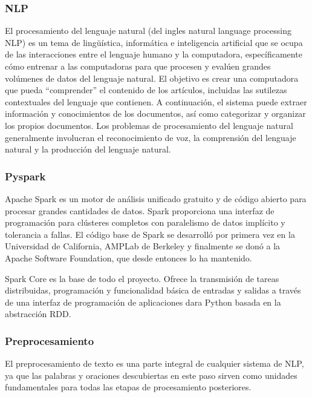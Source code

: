 \documentclass[12pt]{article}
\begin{document}
			\subsubsection{NLP}
			El procesamiento del lenguaje natural (del ingles natural language processing NLP) es un tema de lingüística, informática e inteligencia artificial que se ocupa de las interacciones entre el lenguaje humano y la computadora, específicamente cómo entrenar a las computadoras para que procesen y evalúen grandes volúmenes de datos del lenguaje natural. El objetivo es crear una computadora que pueda ``comprender'' el contenido de los artículos, incluidas las sutilezas contextuales del lenguaje que contienen. A continuación, el sistema puede extraer información y conocimientos de los documentos, así como categorizar y organizar los propios documentos.	Los problemas de procesamiento del lenguaje natural generalmente involucran el reconocimiento de voz, la comprensión del lenguaje natural y la producción del lenguaje natural. \cite{Razno2019}
			
						
			\subsubsection{Pyspark}
			Apache Spark es un motor de análisis unificado gratuito y de código abierto para procesar grandes cantidades de datos. Spark proporciona una interfaz de programación para clústeres completos con paralelismo de datos implícito y tolerancia a fallas. El código base de Spark se desarrolló por primera vez en la Universidad de California, AMPLab de Berkeley y finalmente se donó a la Apache Software Foundation, que desde entonces lo ha mantenido.\cite{Gressling2020}
			
			Spark Core es la base de todo el proyecto. Ofrece la transmisión de tareas distribuidas, programación y funcionalidad básica de entradas y salidas a través de una interfaz de programación de aplicaciones dara Python basada en la abstracción RDD.\cite{Vermeulen2018}
			
			\subsubsection{Preprocesamiento}
			El preprocesamiento de texto es una parte integral de cualquier sistema de NLP, ya que las palabras y oraciones descubiertas en este paso sirven como unidades fundamentales para todas las etapas de procesamiento posteriores. \cite{Kannan2014}%
			
\end{document}
